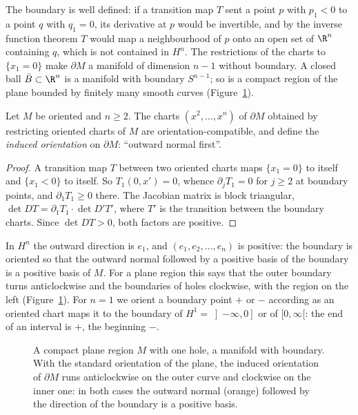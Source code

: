 The boundary is well defined: if a transition map $T$ sent a point $p$ with $p_1<0$ to a point $q$ with $q_1=0$, its derivative at $p$ would be invertible, and by
the inverse function theorem $T$ would map a neighbourhood of $p$ onto an open set of $\R^n$ containing $q$, which is not contained in $H^n$. The
restrictions of the charts to $\{x_1=0\}$ make $\partial M$ a manifold of dimension $n-1$ without boundary. A closed ball $\bar B\subset\R^n$ is a manifold with
boundary $S^{n-1}$; so is a compact region of the plane bounded by finitely many smooth curves (Figure~\ref{fig:boundary}).

\begin{proposition}\label{prop:bdryorient}
Let $M$ be oriented and $n\ge2$. The charts $(x^2,\dots,x^n)$ of $\partial M$ obtained by restricting oriented charts of $M$ are orientation-compatible, and define the
\emph{induced orientation} on $\partial M$: ``outward normal first''.
\end{proposition}
\begin{proof}
A transition map $T$ between two oriented charts maps $\{x_1=0\}$ to itself and $\{x_1<0\}$ to itself. So $T_1(0,x')=0$, whence $\partial_jT_1=0$ for $j\ge2$ at
boundary points, and $\partial_1T_1\ge0$ there. The Jacobian matrix is block triangular, $\det DT=\partial_1T_1\cdot\det D'T'$, where $T'$ is the transition between the boundary
charts. Since $\det DT>0$, both factors are positive.
\end{proof}

In $H^n$ the outward direction is $e_1$, and $(e_1,e_2,\dots,e_n)$ is positive: the boundary is oriented so that the outward normal followed by a positive basis
of the boundary is a positive basis of $M$. For a plane region this says that the outer boundary turns anticlockwise and the boundaries of holes clockwise,
with the region on the left (Figure~\ref{fig:boundary}). For $n=1$ we orient a boundary point $+$ or $-$ according as an oriented chart maps it to the
boundary of $H^1=\left]-\infty,0\right]$ or of $[0,\infty[$: the end of an interval is $+$, the beginning $-$.

\begin{figure}[ht]
\centering
{}
\caption{A compact plane region $M$ with one hole, a manifold with boundary. With the standard orientation of the plane, the induced orientation of
$\partial M$ runs anticlockwise on the outer curve and clockwise on the inner one: in both cases the outward normal (orange) followed by the direction of the
boundary is a positive basis.}
\label{fig:boundary}
\end{figure}

